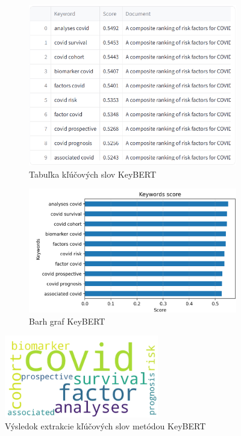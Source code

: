 \documentclass[a4paper,12pt]{article}
\begin{document}

\begin{figure}[htbp]
    \centering
    \begin{subfigure}{0.45\textwidth}
        \includegraphics[width=\textwidth]{../images/keybert_table.png}
        \caption{Tabuľka kľúčových slov KeyBERT}
    \end{subfigure}
    \hfill
    \begin{subfigure}{0.45\textwidth}
        \includegraphics[width=\textwidth]{../images/keybert_barh.png}
        \caption{Barh graf KeyBERT}
    \end{subfigure}

    \vspace{0.5cm}

    \includegraphics[width=0.6\textwidth]{../images/keybert_wordcloud.png}
    \caption{Výsledok extrakcie kľúčových slov metódou KeyBERT}
    \label{fig:keybert}
\end{figure}
\end{document}
